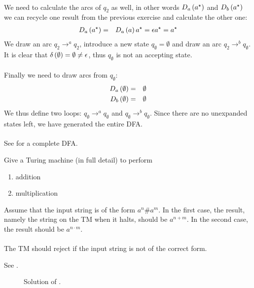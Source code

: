 \documentclass{article}
\begin{document}
\begin{exercise}
\begin{answer}
\paragraph{}
We need to calculate the arcs of $q_2$ as well, in other words $D_a\left( a^{\star} \right)$ and $D_b\left( a^{\star} \right)$ we can recycle one result from the previous exercise and calculate the other one:
\begin{eqnarray}
D_a\left( a^{\star} \right)&=&D_a\left( a \right)a^{\star}=\epsilon a^{\star}=a^{\star}
\end{eqnarray}
We draw an arc $q_2\rightarrow^aq_2$, introduce a new state $q_{\emptyset}=\emptyset$ and draw an arc $q_2\rightarrow^b q_{\emptyset}$. It is clear that $\delta\left( \emptyset \right)=\emptyset\neq\epsilon$, thus $q_{\emptyset}$ is not an accepting state.
\paragraph{}
Finally we need to draw arcs from $q_{\emptyset}$:
\begin{eqnarray}
D_a\left( \emptyset \right)&=&\emptyset\\
D_b\left( \emptyset \right)&=&\emptyset
\end{eqnarray}
We thus define two loops: $q_{\emptyset}\rightarrow^aq_{\emptyset}$ and $q_{\emptyset}\rightarrow^bq_{\emptyset}$. Since there are no unexpanded states left, we have generated the entire DFA.
\paragraph{}
See  for a complete DFA.
\end{answer}
\end{exercise}

\begin{exercise}
Give a Turing machine (in full detail) to perform
\begin{enumerate}
 \item addition
 \item multiplication
\end{enumerate}
Assume that the input string is of the form $a^n\#a^m$. In the first case, the result, namely the string on the TM when it halts, should be $a^{n+m}$. In the second case, the result should be $a^{n\cdot m}$.
\paragraph{}
The TM should reject if the input string is not of the correct form.
\begin{answer}
See .
\begin{figure}[hbt]
\centering
{}
\caption{Solution of .}
\end{figure}
\end{answer}
\end{exercise}
\end{document}
